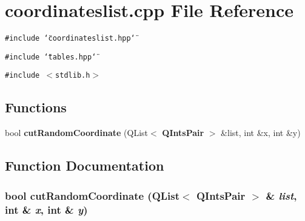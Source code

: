 \section{coordinateslist.cpp File Reference}
\label{coordinateslist_8cpp}
{\tt \#include \char`\"{}coordinateslist.hpp\char`\"{}}\par
{\tt \#include \char`\"{}tables.hpp\char`\"{}}\par
{\tt \#include $<$stdlib.h$>$}\par
\subsection*{Functions}
\begin{CompactItemize}
\item 
bool {\bf cut\-Random\-Coordinate} (QList$<$ {\bf QInts\-Pair} $>$ \&list, int \&x, int \&y)
\end{CompactItemize}


\subsection{Function Documentation}
\subsubsection{\setlength{\rightskip}{0pt plus 5cm}bool cut\-Random\-Coordinate (QList$<$ {\bf QInts\-Pair} $>$ \& {\em list}, int \& {\em x}, int \& {\em y})}\label{coordinateslist_8cpp_a0}


